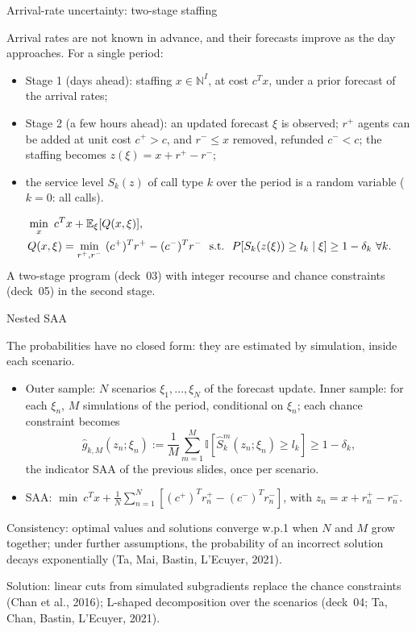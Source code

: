 \documentclass[aspectratio=169]{beamer}
\begin{document}
\begin{frame}{Arrival-rate uncertainty: two-stage staffing}
	
	Arrival rates are not known in advance, and their forecasts improve as the day approaches. For a single period:
	\begin{itemize}
		\item
		{\blue Stage 1} (days ahead): staffing $x \in \mathbb{N}^I$, at cost $c^Tx$, under a prior forecast of the arrival rates;
		\item
		{\blue Stage 2} (a few hours ahead): an updated forecast $\xi$ is observed; $r^+$ agents can be added at unit cost $c^+ > c$, and $r^- \leq x$ removed, refunded $c^- < c$; the staffing becomes $z(\xi) = x + r^+ - r^-$;
		\item
		the service level $S_k(z)$ of call type $k$ over the period is a random variable ($k = 0$: all calls).
	\end{itemize}
	\begin{align*}
	& \min_{x} \ c^Tx + \EE_{\xi}[Q(x,\xi)], \\
	& Q(x,\xi) = \min_{r^+, r^-} \ (c^+)^Tr^+ - (c^-)^Tr^- \ \ \text{s.t.} \ \ P[S_k(z(\xi)) \geq l_k \mid \xi] \geq 1 - \delta_k\ \forall k.
	\end{align*}
	A two-stage program (deck~03) with integer recourse and chance constraints (deck~05) in the second stage.
	
\end{frame}

\begin{frame}{Nested SAA}
	\small
	
	The probabilities have no closed form: they are estimated by simulation, inside each scenario.
	\begin{itemize}
		\item
		{\blue Outer sample}: $N$ scenarios $\xi_1, \ldots, \xi_N$ of the forecast update. {\blue Inner sample}: for each $\xi_n$, $M$ simulations of the period, conditional on $\xi_n$; each chance constraint becomes
		\[
		\hat{g}_{k,M}(z_n; \xi_n) := \frac{1}{M} \sum_{m=1}^M \mathbb{I}\left[\hat{S}_k^m(z_n; \xi_n) \geq l_k\right] \geq 1 - \delta_k,
		\]
		the indicator SAA of the previous slides, once per scenario.
		\item
		{\blue SAA}: $\min \ c^Tx + \frac{1}{N} \sum_{n=1}^N \left[ (c^+)^Tr_n^+ - (c^-)^Tr_n^- \right]$, with $z_n = x + r_n^+ - r_n^-$.
	\end{itemize}
	
	{\blue Consistency}: optimal values and solutions converge w.p.1 when $N$ and $M$ grow together; under further assumptions, the probability of an incorrect solution decays exponentially (Ta, Mai, Bastin, L'Ecuyer, 2021).
	
	{\blue Solution}: linear cuts from simulated subgradients replace the chance constraints (Chan et al., 2016); L-shaped decomposition over the scenarios (deck~04; Ta, Chan, Bastin, L'Ecuyer, 2021).
	
\end{frame}
\end{document}
